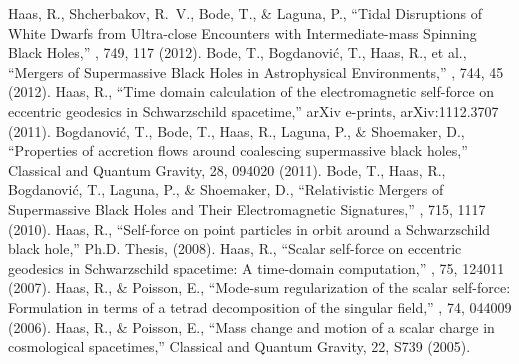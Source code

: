  Haas, R., Shcherbakov, R.~V., Bode, T., \& Laguna, P., ``Tidal Disruptions of White Dwarfs from Ultra-close Encounters with Intermediate-mass Spinning Black Holes,'' \apj, 749, 117 (2012).
 Bode, T., Bogdanovi{\'c}, T., Haas, R., et al., ``Mergers of Supermassive Black Holes in Astrophysical Environments,'' \apj, 744, 45 (2012).
 Haas, R., ``Time domain calculation of the electromagnetic self-force on eccentric geodesics in Schwarzschild spacetime,'' arXiv e-prints, arXiv:1112.3707 (2011).
 Bogdanovi{\'c}, T., Bode, T., Haas, R., Laguna, P., \& Shoemaker, D., ``Properties of accretion flows around coalescing supermassive black holes,'' Classical and Quantum Gravity, 28, 094020 (2011).
 Bode, T., Haas, R., Bogdanovi{\'c}, T., Laguna, P., \& Shoemaker, D., ``Relativistic Mergers of Supermassive Black Holes and Their Electromagnetic Signatures,'' \apj, 715, 1117 (2010).
 Haas, R., ``Self-force on point particles in orbit around a Schwarzschild black hole,'' Ph.D. Thesis, (2008).
 Haas, R., ``Scalar self-force on eccentric geodesics in Schwarzschild spacetime: A time-domain computation,'' \prd, 75, 124011 (2007).
 Haas, R., \& Poisson, E., ``Mode-sum regularization of the scalar self-force: Formulation in terms of a tetrad decomposition of the singular field,'' \prd, 74, 044009 (2006).
 Haas, R., \& Poisson, E., ``Mass change and motion of a scalar charge in cosmological spacetimes,'' Classical and Quantum Gravity, 22, S739 (2005).
